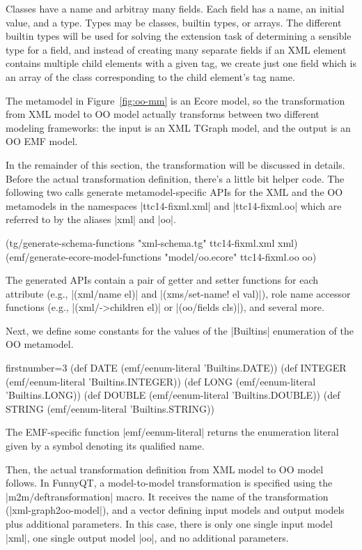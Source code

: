 \documentclass[submission]{eptcs}
\newcommand{\code}{\clojureinline}
\begin{document}
Classes have a name and arbitray many fields.  Each field has a name, an
initial value, and a type.  Types may be classes, builtin types, or arrays.
The different builtin types will be used for solving the extension task of
determining a sensible type for a field, and instead of creating many separate
fields if an XML element contains multiple child elements with a given tag, we
create just one field which is an array of the class corresponding to the child
element's tag name.

The metamodel in Figure~\ref{fig:oo-mm} is an Ecore model, so the
transformation from XML model to OO model actually transforms between two
different modeling frameworks: the input is an XML TGraph model, and the output
is an OO EMF model.

In the remainder of this section, the transformation will be discussed in
details.  Before the actual transformation definition, there's a little bit
helper code.  The following two calls generate metamodel-specific APIs for the
XML and the OO metamodels in the namespaces \code|ttc14-fixml.xml| and
\code|ttc14-fixml.oo| which are referred to by the aliases \code|xml| and
\code|oo|.

\begin{clojurecode}
(tg/generate-schema-functions       "xml-schema.tg"  ttc14-fixml.xml xml)
(emf/generate-ecore-model-functions "model/oo.ecore" ttc14-fixml.oo  oo)
\end{clojurecode}

The generated APIs contain a pair of getter and setter functions for each
attribute (e.g., \code|(xml/name el)| and \code|(xms/set-name! el val)|), role
name accessor functions (e.g., \code|(xml/->children el)| or \code|(oo/fields
cls)|), and several more.

Next, we define some constants for the values of the \code|Builtins|
enumeration of the OO metamodel.

\begin{clojurecode*}{firstnumber=3}
(def DATE    (emf/eenum-literal 'Builtins.DATE))
(def INTEGER (emf/eenum-literal 'Builtins.INTEGER))
(def LONG    (emf/eenum-literal 'Builtins.LONG))
(def DOUBLE  (emf/eenum-literal 'Builtins.DOUBLE))
(def STRING  (emf/eenum-literal 'Builtins.STRING))
\end{clojurecode*}

The EMF-specific function \code|emf/eenum-literal| returns the enumeration
literal given by a symbol denoting its qualified name.

Then, the actual transformation definition from XML model to OO model follows.
In FunnyQT, a model-to-model transformation is specified using the
\code|m2m/deftransformation| macro.  It receives the name of the transformation
(\code|xml-graph2oo-model|), and a vector defining input models and output
models plus additional parameters.  In this case, there is only one single
input model \code|xml|, one single output model \code|oo|, and no additional
parameters.
\end{document}
